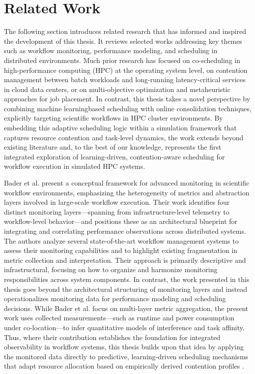 \section{Related Work}
\label{cha:relatedwork}
The following section introduces related research that has informed and inspired the development of this thesis. It reviews selected works addressing key themes such as workflow monitoring, performance modeling, and scheduling in distributed environments. Much prior research has focused on co-scheduling in high-performance computing (HPC) at the operating system level, on contention management between batch workloads and long-running latency-critical services in cloud data centers, or on multi-objective optimization and metaheuristic approaches for job placement. In contrast, this thesis takes a novel perspective by combining machine learningbased scheduling with online consolidation techniques, explicitly targeting scientific workflows in HPC cluster environments. By embedding this adaptive scheduling logic within a simulation framework that captures resource contention and task-level dynamics, the work extends beyond existing literature and, to the best of our knowledge, represents the first integrated exploration of learning-driven, contention-aware scheduling for workflow execution in simulated HPC systems.

Bader et al. present a conceptual framework for advanced monitoring in scientific workflow environments, emphasizing the heterogeneity of metrics and abstraction layers involved in large-scale workflow execution. Their work identifies four distinct monitoring layers—spanning from infrastructure-level telemetry to workflow-level behavior—and positions these as an architectural blueprint for integrating and correlating performance observations across distributed systems. The authors analyze several state-of-the-art workflow management systems to assess their monitoring capabilities and to highlight existing fragmentation in metric collection and interpretation. Their approach is primarily descriptive and infrastructural, focusing on how to organize and harmonize monitoring responsibilities across system components.
In contrast, the work presented in this thesis goes beyond the architectural structuring of monitoring layers and instead operationalizes monitoring data for performance modeling and scheduling decisions. While Bader et al. focus on multi-layer metric aggregation, the present work uses collected measurements—such as runtime and power consumption under co-location—to infer quantitative models of interference and task affinity. Thus, where their contribution establishes the foundation for integrated observability in workflow systems, this thesis builds upon that idea by applying the monitored data directly to predictive, learning-driven scheduling mechanisms that adapt resource allocation based on empirically derived contention profiles \cite{Bader_2022}.

